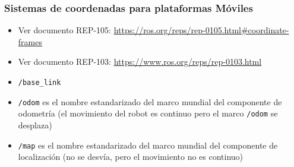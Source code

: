 \begin{frame}[fragile]
    \frametitle{Sistemas de coordenadas para plataformas Móviles}
    \begin{itemize}
        \item Ver documento REP-105: \url{https://ros.org/reps/rep-0105.html#coordinate-frames}
        
        \item Ver documento REP-103: \url{https://www.ros.org/reps/rep-0103.html}
        
        \item \lstinline[style=bash]{/base_link}
        
        \item \lstinline[style=bash]{/odom} es el nombre estandarizado del marco mundial del componente de odometría (el movimiento del robot es continuo pero el marco \lstinline[style=bash]{/odom} se desplaza)
        
        \item \lstinline[style=bash]{/map} es el nombre estandarizado del marco mundial del componente de localización (no se desvía, pero el movimiento no es continuo)
        
    \end{itemize}
    
\end{frame}


